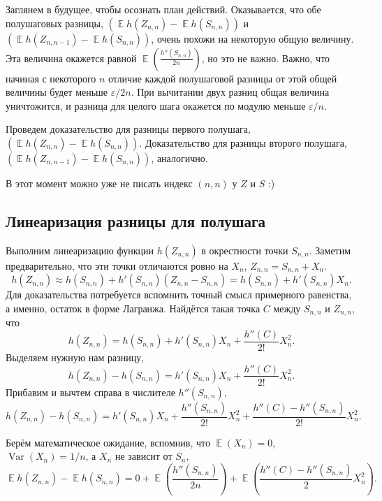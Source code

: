 \documentclass[
  letterpaper,
  DIV=11,
  numbers=noendperiod]{scrartcl}
\begin{document}
Заглянем в будущее, чтобы осознать план действий. Оказывается, что обе
полушаговых разницы,
\(\left(\mathop{\mathrm{\mathbb{E}}}h(Z_{n,n}) - \mathop{\mathrm{\mathbb{E}}}h(S_{n,n}) \right)\)
и
\(\left(\mathop{\mathrm{\mathbb{E}}}h(Z_{n,n-1}) - \mathop{\mathrm{\mathbb{E}}}h(S_{n,n}) \right)\),
очень похожи на некоторую общую величину. Эта величина окажется равной
\(\mathop{\mathrm{\mathbb{E}}}\left(\frac{h''(S_{n,n})}{2n}\right)\), но
это не важно. Важно, что начиная с некоторого \(n\) отличие каждой
полушаговой разницы от этой общей величины будет меньше
\(\varepsilon/2n\). При вычитании двух разниц общая величина
уничтожится, и разница для целого шага окажется по модулю меньше
\(\varepsilon/n\).

Проведем доказательство для разницы первого полушага,
\(\left(\mathop{\mathrm{\mathbb{E}}}h(Z_{n,n}) - \mathop{\mathrm{\mathbb{E}}}h(S_{n,n}) \right)\).
Доказательство для разницы второго полушага,
\(\left(\mathop{\mathrm{\mathbb{E}}}h(Z_{n,n-1}) - \mathop{\mathrm{\mathbb{E}}}h(S_{n,n}) \right)\),
аналогично.

В этот момент можно уже не писать индекс \((n,n)\) у \(Z\) и \(S\) :)

\subsection{Линеаризация разницы для
полушага}\label{sec-linearizing-difference}

Выполним линеаризацию функции \(h(Z_{n,n})\) в окрестности точки
\(S_{n,n}\). Заметим предварительно, что эти точки отличаются ровно на
\(X_n\), \(Z_{n,n} = S_{n,n} + X_n\). \[
h(Z_{n,n}) \approx h(S_{n,n}) + h'(S_{n,n})(Z_{n,n} - S_{n,n}) = h(S_{n,n}) + h'(S_{n,n}) X_n.
\] Для доказательства потребуется вспомнить точный смысл примерного
равенства, а именно, остаток в форме Лагранжа. Найдётся такая точка
\(C\) между \(S_{n,n}\) и \(Z_{n,n}\), что \[
h(Z_{n,n}) = h(S_{n,n}) + h'(S_{n,n})X_n + \frac{h''(C)}{2!}X_n^2.
\] Выделяем нужную нам разницу, \[
h(Z_{n,n}) - h(S_{n,n}) = h'(S_{n,n})X_n + \frac{h''(C)}{2!}X_n^2.
\] Прибавим и вычтем справа в числителе \(h''(S_{n,n})\), \[
h(Z_{n,n}) - h(S_{n,n}) = h'(S_{n,n})X_n + \frac{h''(S_{n,n})}{2!}X_n^2 + \frac{h''(C) - h''(S_{n,n})}{2!}X_n^2.
\]

Берём математическое ожидание, вспомнив, что
\(\mathop{\mathrm{\mathbb{E}}}(X_n) =0\),
\(\mathop{\mathrm{Var}}(X_n)= 1/n\), а \(X_n\) не зависит от \(S_n\), \[
\mathop{\mathrm{\mathbb{E}}}h(Z_{n,n}) - \mathop{\mathrm{\mathbb{E}}}h(S_{n,n}) = 0 + \mathop{\mathrm{\mathbb{E}}}\left(\frac{h''(S_{n,n})}{2n}\right) + \mathop{\mathrm{\mathbb{E}}}\left(\frac{h''(C) - h''(S_{n,n})}{2}X_n^2\right).
\]
\end{document}

